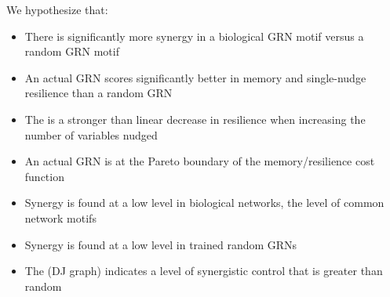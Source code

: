\documentclass[../main.tex]{subfiles}
\begin{document}
We hypothesize that:

\begin{itemize}
\item There is significantly more synergy in a biological GRN motif versus a random GRN motif
\item An actual GRN scores significantly better in memory and single-nudge resilience than a random GRN
\item The is a stronger than linear decrease in resilience when increasing the number of variables nudged
\item An actual GRN is at the Pareto boundary of the memory/resilience cost function
\item Synergy is found at a low level in biological networks, the level of common network motifs 
\item Synergy is found at a low level in trained random GRNs
\item The (DJ graph) indicates a level of synergistic control that is greater than random
\end{itemize}
\end{document}
